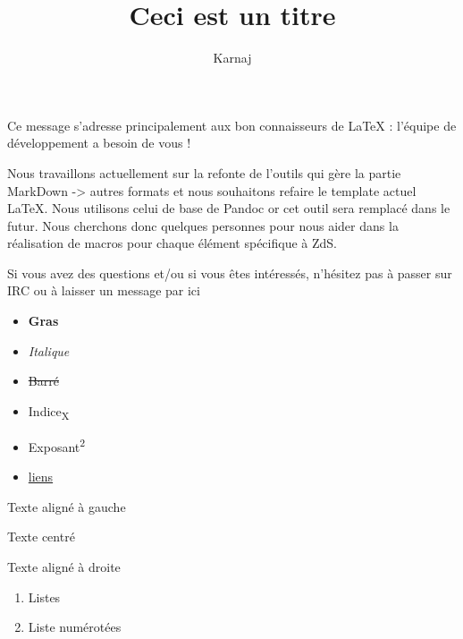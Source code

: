 \documentclass[small]{zmdocument}
\title{Ceci est un titre}
\author{Karnaj}
\begin{document}
\maketitle
\tableofcontents


Ce message s’adresse principalement aux bon connaisseurs de LaTeX : l’équipe de développement a besoin de vous !

Nous travaillons actuellement sur la refonte de l’outils qui gère la partie MarkDown -> autres formats et nous souhaitons refaire le template actuel LaTeX. Nous utilisons celui de base de Pandoc or cet outil sera remplacé dans le futur. Nous cherchons donc quelques personnes pour nous aider dans la réalisation de macros pour chaque élément spécifique à ZdS.

Si vous avez des questions et/ou si vous êtes intéressés, n’hésitez pas à passer sur IRC ou à laisser un message par ici


\begin{itemize}
\item \textbf{Gras}
\item \textit{Italique}
\item \sout{Barré}
\item Indice\textsubscript{X}
\item Exposant\textsuperscript{2}
\item \href{zestedesavoir.com}{liens}
\end{itemize}

\begin{flushleft}
Texte aligné à gauche
\end{flushleft}

\begin{center}
Texte centré
\end{center}

\begin{flushright}
Texte aligné à droite
\end{flushright}

\begin{enumerate}
\item Listes
\item Liste numérotées
\end{enumerate}

\end{document}

